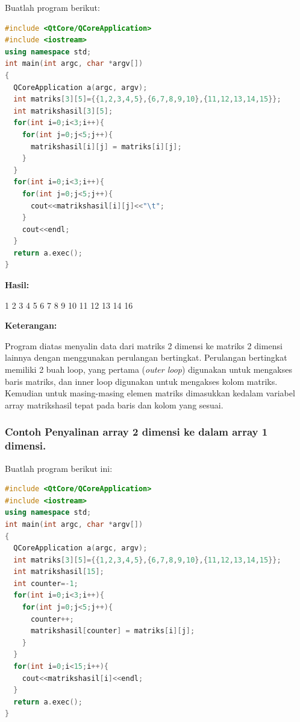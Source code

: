 Buatlah program berikut:

\begin{lstlisting}[language=c++, caption=Penyalinan Array 2 Dimensi ke Array 2 Dimensi lainnya, label=contoh3-10]
#include <QtCore/QCoreApplication>
#include <iostream>
using namespace std;
int main(int argc, char *argv[])
{
  QCoreApplication a(argc, argv);
  int matriks[3][5]={{1,2,3,4,5},{6,7,8,9,10},{11,12,13,14,15}};
  int matrikshasil[3][5];
  for(int i=0;i<3;i++){
    for(int j=0;j<5;j++){
      matrikshasil[i][j] = matriks[i][j];
    }
  }
  for(int i=0;i<3;i++){
    for(int j=0;j<5;j++){
      cout<<matrikshasil[i][j]<<"\t";
    }
    cout<<endl;
  }
  return a.exec();
}
\end{lstlisting}

\textbf{Hasil:}

\begin{lcverbatim}
1	2	3	4	5
6	7	8	9	10
11	12	13	14	16
\end{lcverbatim}

\textbf{Keterangan:}

Program diatas menyalin data dari matriks 2 dimensi ke matriks 2 dimensi
lainnya dengan menggunakan perulangan bertingkat. Perulangan bertingkat
memiliki 2 buah loop, yang pertama (\emph{outer loop}) digunakan untuk
mengakses baris matriks, dan inner loop digunakan untuk mengakses kolom
matriks. Kemudian untuk masing-masing elemen matriks dimasukkan kedalam
variabel array matrikshasil tepat pada baris dan kolom yang sesuai.

\subsubsection*{Contoh  Penyalinan array 2 dimensi ke dalam array 1 dimensi.}

Buatlah program berikut ini:

\begin{lstlisting}[language=c++, caption=Penyalinan array 2 dimensi ke dalam array 1 dimensi, label=contoh3-11]
#include <QtCore/QCoreApplication>
#include <iostream>
using namespace std;
int main(int argc, char *argv[])
{
  QCoreApplication a(argc, argv);
  int matriks[3][5]={{1,2,3,4,5},{6,7,8,9,10},{11,12,13,14,15}};
  int matrikshasil[15];
  int counter=-1;
  for(int i=0;i<3;i++){
    for(int j=0;j<5;j++){
      counter++;
      matrikshasil[counter] = matriks[i][j];
    }
  }
  for(int i=0;i<15;i++){
    cout<<matrikshasil[i]<<endl;
  }
  return a.exec();
}
\end{lstlisting}

